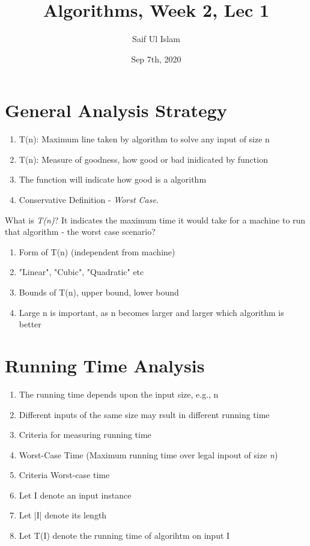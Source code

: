 \documentclass{article}
\author{Saif Ul Islam}
\date{Sep 7th, 2020}
\title{Algorithms, Week 2, Lec 1}
\begin{document}
    \maketitle

    \tableofcontents

    \section{General Analysis Strategy}

    \begin{enumerate}
        \item T(n): Maximum line taken by algorithm to solve any input of size n
        \item T(n): Measure of goodness, how good or bad inidicated by function
        \item The function will indicate how good is a algorithm
        \item Conservative Definition - \textit{Worst Case}.
    \end{enumerate}

    What is \textit{T(n)}? It indicates the maximum time it would take for a machine to run that algorithm - the worst case scenario?

    \begin{enumerate}
        \item Form of T(n) (independent from machine)
        \item "Linear", "Cubic", "Quadratic" etc
        \item Bounds of T(n), upper bound, lower bound
        \item Large n is important, as n becomes larger and larger which algorithm is better
    \end{enumerate}

    \section{Running Time Analysis}

    \begin{enumerate}
        \item The running time depends upon the input size, e.g., n
        \item Different inputs of the same size may rsult in different running time
        \item Criteria for measuring running time
        \item Worst-Case Time (Maximum running time over legal inpout of size \textit{n})
        \item Criteria Worst-case time
        \item Let I denote an input instance
        \item Let |I| denote its length
        \item Let T(I) denote the running time of algorihtm on input I
    \end{enumerate}
\end{document}
